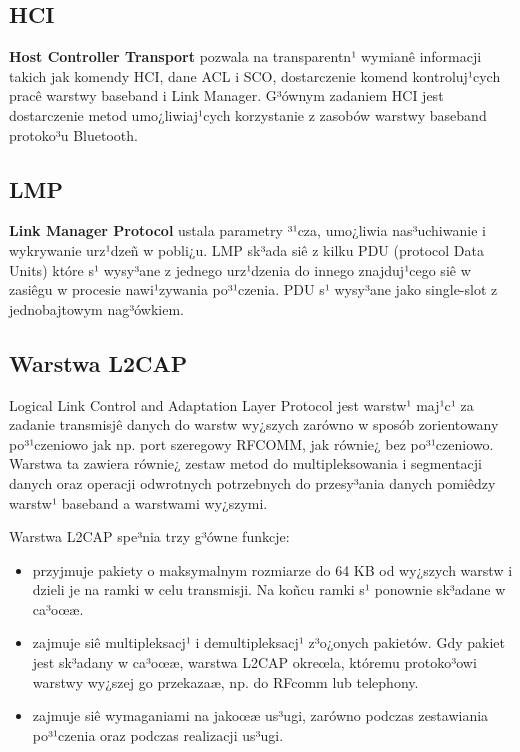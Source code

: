 %
\subsection{HCI}
\label{sec:Warstwa HCI}

\textbf{Host Controller Transport} pozwala na transparentn¹ wymianê
informacji takich jak komendy HCI, dane ACL i SCO, dostarczenie
komend kontroluj¹cych pracê warstwy baseband i Link Manager. G³ównym
zadaniem HCI jest dostarczenie metod umo¿liwiaj¹cych korzystanie z
zasobów warstwy baseband protoko³u Bluetooth.

\subsection{LMP}
\label{sec:Warstwa LMP} \textbf{Link Manager Protocol} ustala
parametry ³¹cza, umo¿liwia nas³uchiwanie i wykrywanie urz¹dzeñ w
pobli¿u. LMP sk³ada siê z kilku PDU (protocol Data Units) które s¹ wysy³ane z
jednego urz¹dzenia do innego znajduj¹cego siê w zasiêgu w procesie
nawi¹zywania po³¹czenia. PDU s¹ wysy³ane jako single-slot z
jednobajtowym nag³ówkiem.
%
\subsection{Warstwa L2CAP}
\label{sec:Warstwa L2CAP}

Logical Link Control and Adaptation Layer Protocol jest warstw¹
maj¹c¹ za zadanie transmisjê danych do warstw wy¿szych zarówno w
sposób zorientowany po³¹czeniowo jak np. port szeregowy RFCOMM, jak
równie¿ bez po³¹czeniowo. Warstwa ta zawiera równie¿ zestaw metod do
multipleksowania i segmentacji danych oraz operacji odwrotnych
potrzebnych do przesy³ania danych pomiêdzy warstw¹ baseband a
warstwami wy¿szymi.

 Warstwa L2CAP spe³nia trzy g³ówne funkcje:
\begin{itemize}
  \item przyjmuje pakiety o maksymalnym rozmiarze do 64 KB od wy¿szych warstw i dzieli je na ramki w celu transmisji.
   Na koñcu ramki s¹ ponownie sk³adane w ca³oœæ.
  \item zajmuje siê multipleksacj¹ i demultipleksacj¹ z³o¿onych pakietów. Gdy pakiet jest sk³adany w ca³oœæ, warstwa L2CAP okreœla, któremu protoko³owi warstwy wy¿szej go przekazaæ, np. do RFcomm lub telephony.
  \item zajmuje siê wymaganiami na jakoœæ us³ugi, zarówno podczas zestawiania po³¹czenia oraz podczas realizacji us³ugi.
\end{itemize}

